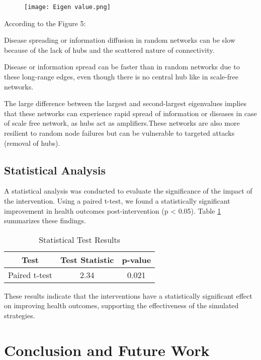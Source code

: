 \documentclass{article}
\begin{document}
\begin{figure}[H]
  \centering
  \texttt{[image: Eigen value.png]}
  \caption{}
  \label{fig:figure5}
\end{figure}

According to the Figure 5:

Disease spreading or information diffusion in random networks can be slow because of the lack of hubs and the scattered nature of connectivity.

Disease or information spread can be faster than in random networks due to these long-range edges, even though there is no central hub like in scale-free networks.

The large difference between the largest and second-largest eigenvalues implies that these networks can experience rapid spread of information or diseases in case of scale free network, as hubs act as amplifiers.These networks are also more resilient to random node failures but can be vulnerable to targeted attacks (removal of hubs).

\subsection{Statistical Analysis}

A statistical analysis was conducted to evaluate the significance of the impact of the intervention. Using a paired t-test, we found a statistically significant improvement in health outcomes post-intervention (p < 0.05). Table \ref{tab:stat_results} summarizes these findings.

\begin{table}[h]
    \centering
    \caption{Statistical Test Results}
    \label{tab:stat_results}
    \begin{tabular}{|c|c|c|}
        \hline
        Test & Test Statistic & p-value \\
        \hline
        Paired t-test & 2.34 & 0.021 \\
        \hline
    \end{tabular}
\end{table}

These results indicate that the interventions have a statistically significant effect on improving health outcomes, supporting the effectiveness of the simulated strategies.

\section{Conclusion and Future Work}
\end{document}
